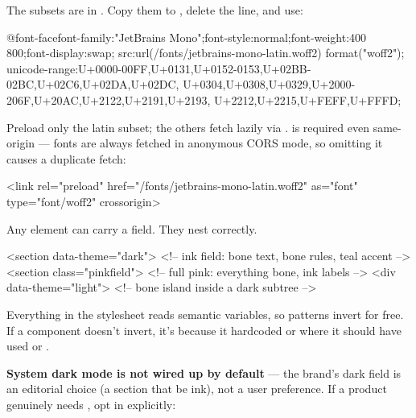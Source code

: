 \documentclass[fontpath=fonts/,logopath=logo/]{riposte-doc}
\begin{document}
The subsets are in . Copy them to , delete the  line, and use:

\ripcodeopen
{}
\begin{ripcodeblock}
@font-face{font-family:"JetBrains Mono";font-style:normal;font-weight:400 800;font-display:swap;
  src:url(/fonts/jetbrains-mono-latin.woff2) format("woff2");
  unicode-range:U+0000-00FF,U+0131,U+0152-0153,U+02BB-02BC,U+02C6,U+02DA,U+02DC,
                U+0304,U+0308,U+0329,U+2000-206F,U+20AC,U+2122,U+2191,U+2193,
                U+2212,U+2215,U+FEFF,U+FFFD;}
\end{ripcodeblock}
\ripcodesizereset\ripcodeclose

Preload only the latin subset; the others fetch lazily via .  is required even same-origin — fonts are always fetched in anonymous CORS mode, so omitting it causes a duplicate fetch:

\ripcodeopen
{}
\begin{ripcodeblock}
<link rel="preload" href="/fonts/jetbrains-mono-latin.woff2" as="font" type="font/woff2" crossorigin>
\end{ripcodeblock}
\ripcodesizereset\ripcodeclose



Any element can carry a field. They nest correctly.

\ripcodeopen
{}
\begin{ripcodeblock}
<section data-theme="dark">   <!-- ink field: bone text, bone rules, teal accent -->
<section class="pinkfield">   <!-- full pink: everything bone, ink labels -->
<div data-theme="light">      <!-- bone island inside a dark subtree -->
\end{ripcodeblock}
\ripcodesizereset\ripcodeclose

Everything in the stylesheet reads semantic variables, so patterns invert for free. If a component doesn't invert, it's because it hardcoded  or  where it should have used  or .

\textbf{System dark mode is not wired up by default} — the brand's dark field is an editorial choice (a section that  be ink), not a user preference. If a product genuinely needs , opt in explicitly:
\end{document}
